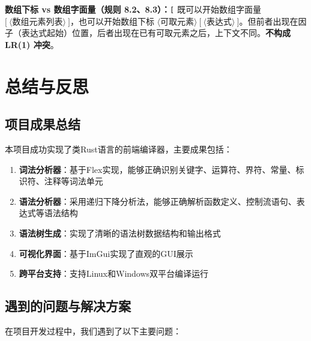 \documentclass[12pt,a4paper]{ctexart}
\begin{document}
\textbf{数组下标 vs 数组字面量（规则 8.2、8.3）：}\texttt{[} 既可以开始数组字面量 $\texttt{[} \ \langle\text{数组元素列表}\rangle \ \texttt{]}$，也可以开始数组下标 $\langle\text{可取元素}\rangle \ \texttt{[} \ \langle\text{表达式}\rangle \ \texttt{]}$。但前者出现在因子（表达式起始）位置，后者出现在已有可取元素之后，上下文不同。\textbf{不构成 LR(1) 冲突}。

\newpage

\section{总结与反思}

\subsection{项目成果总结}

本项目成功实现了类Rust语言的前端编译器，主要成果包括：

\begin{enumerate}
    \item \textbf{词法分析器}：基于Flex实现，能够正确识别关键字、运算符、界符、常量、标识符、注释等词法单元
    \item \textbf{语法分析器}：采用递归下降分析法，能够正确解析函数定义、控制流语句、表达式等语法结构
    \item \textbf{语法树生成}：实现了清晰的语法树数据结构和输出格式
    \item \textbf{可视化界面}：基于ImGui实现了直观的GUI展示
    \item \textbf{跨平台支持}：支持Linux和Windows双平台编译运行
\end{enumerate}

\subsection{遇到的问题与解决方案}

在项目开发过程中，我们遇到了以下主要问题：
\end{document}

